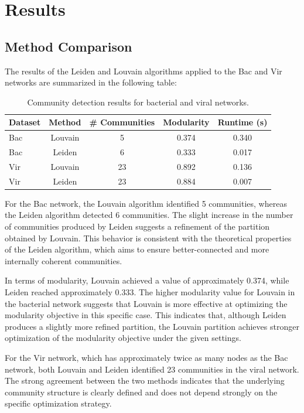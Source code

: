 
\section{Results}

\subsection{Method Comparison}

The results of the Leiden and Louvain algorithms applied to the Bac and Vir networks are summarized in the following table:

\begin{table}[htbp]
\centering
\caption{Community detection results for bacterial and viral networks.}
\label{tab:community_results}
\begin{tabular}{lcccc}
\hline
Dataset & Method & \# Communities & Modularity & Runtime (s) \\
\hline
Bac & Louvain & 5  & 0.374 & 0.340 \\
Bac & Leiden  & 6  & 0.333 & 0.017 \\
Vir & Louvain & 23 & 0.892 & 0.136 \\
Vir & Leiden  & 23 & 0.884 & 0.007 \\
\hline
\end{tabular}
\end{table}

For the Bac network, the Louvain algorithm identified 5 communities, 
whereas the Leiden algorithm detected 6 communities.
The slight increase in the number of communities produced by Leiden suggests a 
refinement of the partition obtained by Louvain. This behavior is consistent with the theoretical properties
of the Leiden algorithm, which aims to ensure better-connected and more internally coherent communities.

In terms of modularity, Louvain achieved a value of approximately 0.374,
while Leiden reached approximately 0.333. 
The higher modularity value for Louvain in the bacterial network suggests that 
Louvain is more effective at optimizing the modularity objective in this specific case.
This indicates that, although Leiden produces a slightly more refined partition, 
the Louvain partition achieves stronger optimization of the modularity objective under the given settings.

For the Vir network, which has approximately twice as many nodes as the Bac network,
both Louvain and Leiden identified 23 communities in the viral network.
The strong agreement between the two methods indicates that the underlying community 
structure is clearly defined and does not depend strongly on the specific optimization strategy.

